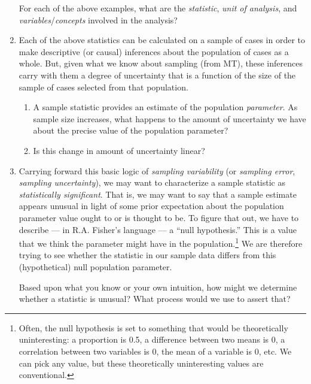 \documentclass[a4paper,12pt]{article}
\begin{document}
\begin{enumerate}
For each of the above examples, what are the \textit{statistic}, \textit{unit of analysis}, and \textit{variables}/\textit{concepts} involved in the analysis?

\item Each of the above statistics can be calculated on a sample of cases in order to make descriptive (or causal) inferences about the population of cases as a whole. But, given what we know about sampling (from MT), these inferences carry with them a degree of uncertainty that is a function of the size of the sample of cases selected from that population.

	\begin{enumerate}
	\item A sample statistic provides an estimate of the population \textit{parameter}. As sample size increases, what happens to the amount of uncertainty we have about the precise value of the population parameter?
	\item Is this change in amount of uncertainty linear?
	\end{enumerate}

\vspace{4em}

\item Carrying forward this basic logic of \textit{sampling variability} (or \textit{sampling error}, \textit{sampling uncertainty}), we may want to characterize a sample statistic as \textit{statistically significant}. That is, we may want to say that a sample estimate appears unusual in light of some prior expectation about the population parameter value ought to or is thought to be. To figure that out, we have to describe --- in R.A. Fisher's language --- a ``null hypothesis.'' This is a value that we think the parameter might have in the population.\footnote{Often, the null hypothesis is set to something that would be theoretically uninteresting: a proportion is 0.5, a difference between two means is 0, a correlation between two variables is 0, the mean of a variable is 0, etc. We can pick any value, but these theoretically uninteresting values are conventional.} We are therefore trying to see whether the statistic in our sample data differs from this (hypothetical) null population parameter.

Based upon what you know or your own intuition, how might we determine whether a statistic is unusual? What process would we use to assert that?

\vspace{4em}


\end{enumerate}
\end{document}
